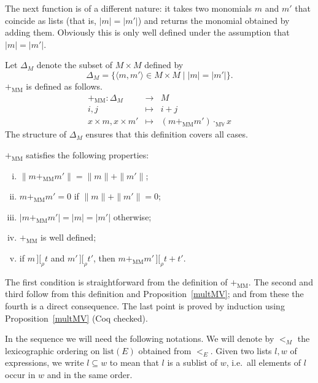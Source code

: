 \documentclass[numreferences]{kluwer}
\newcommand{\intII}{\,]\![}
\newcommand{\intrel}{\mathbin{\intII_{\rho}}}
\newcommand{\alt}{\mathrel{|}}
\newcommand{\V}{{\mathbb V}}
\newcommand{\multMV}{\ensuremath{\cdot_{\mathrm M\V}}}
\newcommand{\plusMM}{\ensuremath{+_{\mathrm{MM}}}}
\begin{document}
\begin{article}
The next function is of a different nature: it takes two monomials $m$
and $m'$ that coincide as lists (that is, $|m|=|m'|$) and returns the
monomial obtained by adding them.  Obviously this is only well defined
under the assumption that $|m|=|m'|$.

\begin{definition}\label{defn:plusMM} Let $\Delta_M$ denote the subset of
$M\times M$ defined by
\[\Delta_M=\{\langle m,m'\rangle\in M\times M \alt |m|=|m'|\}.\]
{\plusMM} is defined as follows.
\begin{eqnarray*}
\plusMM : \Delta_M & \to & M \\
 i, j & \mapsto & i+j \\
 x\times m, x\times m' & \mapsto & (m\plusMM m')\multMV x
\end{eqnarray*}
The structure of $\Delta_M$ ensures that this definition covers all cases.
\end{definition}

\begin{proposition}\label{plusMM}
{\plusMM} satisfies the following properties:
\begin{enumerate}[(i)]
\item $\|m\plusMM m'\|=\|m\|+\|m'\|$;
\item $m\plusMM m'=0$ if $\|m\|+\|m'\|=0$;
\item $|m\plusMM m'|=|m|=|m'|$ otherwise;
\item {\plusMM} is well defined;
\item if $m\intrel t$ and $m'\intrel t'$, then $m\plusMM m'\intrel t+t'$.
\end{enumerate}
\end{proposition}
\begin{pf}
The first condition is straightforward from the definition of {\plusMM}.
The second and third follow from this definition and
Proposition~\ref{multMV}; and from these the fourth is a direct consequence.
The last point is proved by induction using
Proposition~\ref{multMV} (Coq checked).
\end{pf}

In the sequence we will need the following notations.
We will denote by $<_M$ the lexicographic ordering on $\mathrm{list}(E)$
obtained from $<_E$.
Given two lists $l,w$ of expressions, we write $l\subseteq w$ to mean
that $l$ is a sublist of $w$, i.e.\ all elements of $l$ occur in $w$ and
in the same order.


\end{article}
\end{document}
